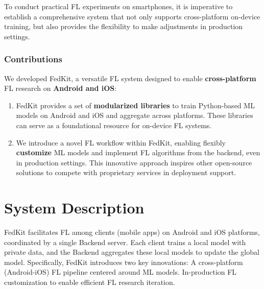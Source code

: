 \documentclass[letterpaper]{article} %
\newcommand*\circled[1]{\tikz[baseline=(char.base)]{
            \node[shape=circle,draw,inner sep=.6pt] (char) {#1};}}
\begin{document}
To conduct practical FL experiments on smartphones,
it is imperative to establish a comprehensive system that
not only supports cross-platform on-device training,
but also provides the flexibility to make adjustments in production settings.

\subsubsection{Contributions}
We developed FedKit,
a versatile FL system designed to enable \textbf{cross-platform} FL research on
\textbf{Android and iOS}:
\begin{enumerate}[label=$\bullet$]
    \item FedKit provides a set of \textbf{modularized libraries} to train
        Python-based ML models on Android and iOS and
        aggregate across platforms.
        These libraries can serve as a foundational resource for
        on-device FL systems.
    \item We introduce a novel FL workflow within FedKit,
        enabling flexibly \textbf{customize} ML models and implement FL algorithms from
        the backend, even in production settings.
        This innovative approach inspires other open-source solutions to
        compete with proprietary services in deployment support.
\end{enumerate}

\section{System Description}

FedKit facilitates FL among clients (mobile apps) on Android and iOS platforms,
coordinated by a single Backend server.
Each client trains a local model with private data,
and the Backend aggregates these local models to update the global model.
Specifically, FedKit introduces two key innovations: 
\circled{1} A cross-platform (Android-iOS) FL pipeline centered around ML models.
\circled{2} In-production FL customization to enable efficient FL research iteration.
\end{document}

